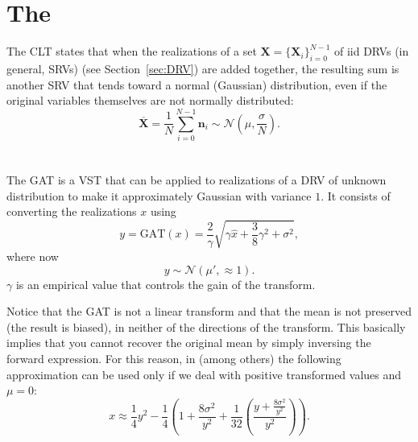 \section{The }
\label{sec:CLT}

The \acrshort{CLT} states that when the realizations of a set $\bm{X}=\{\bm{X}_i\}_{i=0}^{N-1}$ of
\gls{iid} \glspl{DRV} (in general, \glspl{SRV}) (see
Section~\ref{sec:DRV}) are added together, the resulting sum is
another \gls{SRV} that tends toward a normal (Gaussian) distribution,
even if the original variables themselves are not normally
distributed:
\begin{equation}
  \overline{\bm{X}} = \frac{1}{N}\sum_{i=0}^{N-1}\bm{n}_i\sim\mathcal{N}(\mu,\frac{\sigma}{N}).
\end{equation}


\section{} %

The \acrshort{GAT} \cite{foi2008practical,makitalo2012optimal} is a
\gls{VST} that can be applied to realizations of a \gls{DRV} of
unknown distribution to make it approximately Gaussian with variance
$1$. It consists of converting the realizations $x$ using 
\begin{equation}
  y = \text{GAT}(x)=\frac{2}{\gamma}\sqrt{\gamma\hat{x}+\frac{3}{8}\gamma^2+\sigma^2},
\end{equation}
where now
\begin{equation}
  y\sim\mathcal{N}(\mu',\approx 1).
\end{equation}
$\gamma$ is an empirical value that controls the gain of the transform.

Notice that the \gls{GAT} is not a linear transform and that the mean
is not preserved (the result is biased), in neither of the directions
of the transform. This basically implies that you cannot recover the
original mean by simply inversing the forward expression. For this
reason, in \cite{makitalo2012optimal} (among others) the following
approximation can be used only if we deal with positive transformed
values and $\mu=0$:
\begin{equation}
  x \approx \frac{1}{4}y^2-\frac{1}{4}\left(1+\frac{8\sigma^2}{y^2} + \frac{1}{32}\left(\frac{y+\frac{8\sigma^2}{y^2}}{y^2}\right)\right).
\end{equation}

